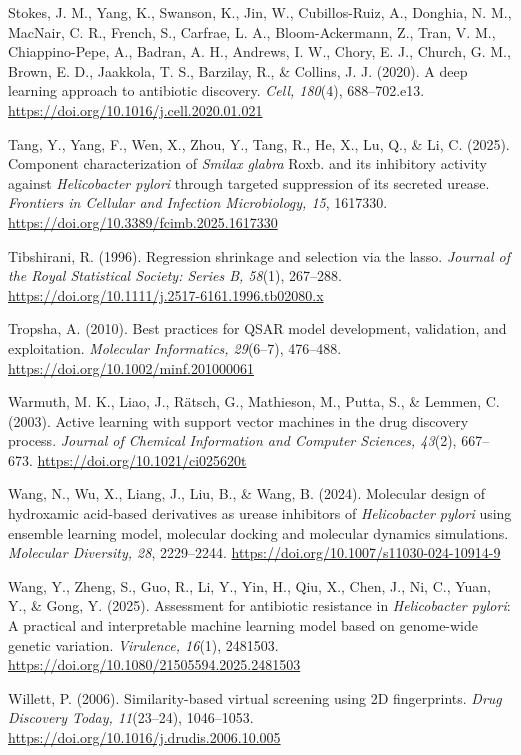 \documentclass[11pt]{article}
\begin{document}
Stokes, J. M., Yang, K., Swanson, K., Jin, W., Cubillos-Ruiz, A., Donghia, N. M., MacNair, C. R., French, S., Carfrae, L. A., Bloom-Ackermann, Z., Tran, V. M., Chiappino-Pepe, A., Badran, A. H., Andrews, I. W., Chory, E. J., Church, G. M., Brown, E. D., Jaakkola, T. S., Barzilay, R., \& Collins, J. J. (2020). A deep learning approach to antibiotic discovery. \textit{Cell, 180}(4), 688--702.e13. \url{https://doi.org/10.1016/j.cell.2020.01.021}

Tang, Y., Yang, F., Wen, X., Zhou, Y., Tang, R., He, X., Lu, Q., \& Li, C. (2025). Component characterization of \textit{Smilax glabra} Roxb. and its inhibitory activity against \textit{Helicobacter pylori} through targeted suppression of its secreted urease. \textit{Frontiers in Cellular and Infection Microbiology, 15}, 1617330. \url{https://doi.org/10.3389/fcimb.2025.1617330}

Tibshirani, R. (1996). Regression shrinkage and selection via the lasso. \textit{Journal of the Royal Statistical Society: Series B, 58}(1), 267--288. \url{https://doi.org/10.1111/j.2517-6161.1996.tb02080.x}

Tropsha, A. (2010). Best practices for QSAR model development, validation, and exploitation. \textit{Molecular Informatics, 29}(6--7), 476--488. \url{https://doi.org/10.1002/minf.201000061}

Warmuth, M. K., Liao, J., Rätsch, G., Mathieson, M., Putta, S., \& Lemmen, C. (2003). Active learning with support vector machines in the drug discovery process. \textit{Journal of Chemical Information and Computer Sciences, 43}(2), 667--673. \url{https://doi.org/10.1021/ci025620t}

Wang, N., Wu, X., Liang, J., Liu, B., \& Wang, B. (2024). Molecular design of hydroxamic acid-based derivatives as urease inhibitors of \textit{Helicobacter pylori} using ensemble learning model, molecular docking and molecular dynamics simulations. \textit{Molecular Diversity, 28}, 2229--2244. \url{https://doi.org/10.1007/s11030-024-10914-9}

Wang, Y., Zheng, S., Guo, R., Li, Y., Yin, H., Qiu, X., Chen, J., Ni, C., Yuan, Y., \& Gong, Y. (2025). Assessment for antibiotic resistance in \textit{Helicobacter pylori}: A practical and interpretable machine learning model based on genome-wide genetic variation. \textit{Virulence, 16}(1), 2481503. \url{https://doi.org/10.1080/21505594.2025.2481503}

Willett, P. (2006). Similarity-based virtual screening using 2D fingerprints. \textit{Drug Discovery Today, 11}(23--24), 1046--1053. \url{https://doi.org/10.1016/j.drudis.2006.10.005}
\end{document}
